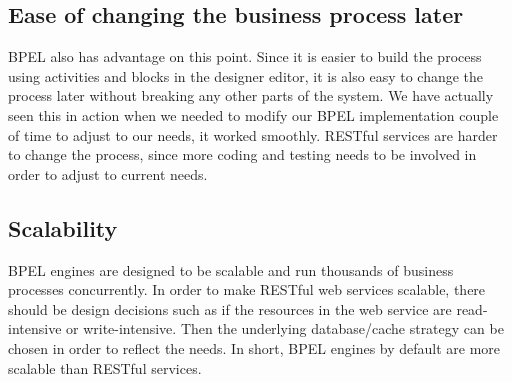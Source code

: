 \subsection*{Ease of changing the business process later}

BPEL also has advantage on this point. Since it is easier to build the process using activities and blocks in the designer editor, it is also easy to change the process later without breaking any other parts of the system. We have actually seen this in action when we needed to modify our BPEL implementation couple of time to adjust to our needs, it worked smoothly. RESTful services are harder to change the process, since more coding and testing needs to be involved in order to adjust to current needs.

\subsection*{Scalability}

BPEL engines are designed to be scalable and run thousands of business processes concurrently. In order to make RESTful web services scalable, there should be design decisions such as if the resources in the web service are read-intensive or write-intensive. Then the underlying database/cache strategy can be chosen in order to reflect the needs. In short, BPEL engines by default are more scalable than RESTful services. 